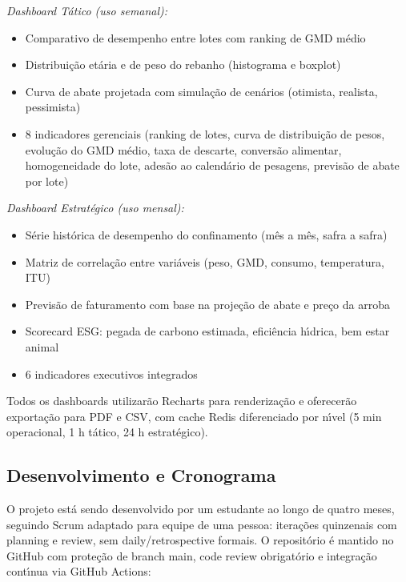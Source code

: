 \documentclass[12pt,a4paper]{article}
\begin{document}
\textit{Dashboard T\'atico (uso semanal):}

\begin{itemize}[leftmargin=*]
\item Comparativo de desempenho entre lotes com ranking de GMD m\'edio
\item Distribui\c c\~ao et\'aria e de peso do rebanho (histograma e boxplot)
\item Curva de abate projetada com simula\c c\~ao de cen\'arios (otimista, realista, pessimista)
\item 8 indicadores gerenciais (ranking de lotes, curva de distribui\c c\~ao de pesos, evolu\c c\~ao do GMD m\'edio, taxa de descarte, convers\~ao alimentar, homogeneidade do lote, ades\~ao ao calend\'ario de pesagens, previs\~ao de abate por lote)
\end{itemize}

\textit{Dashboard Estrat\'egico (uso mensal):}

\begin{itemize}[leftmargin=*]
\item S\'erie hist\'orica de desempenho do confinamento (m\^es a m\^es, safra a safra)
\item Matriz de correla\c c\~ao entre vari\'aveis (peso, GMD, consumo, temperatura, ITU)
\item Previs\~ao de faturamento com base na proje\c c\~ao de abate e pre\c co da arroba
\item Scorecard ESG: pegada de carbono estimada, efici\^encia h\'{\i}drica, bem estar animal
\item 6 indicadores executivos integrados
\end{itemize}

Todos os dashboards utilizar\~ao Recharts para renderiza\c c\~ao e oferecer\~ao exporta\c c\~ao para PDF e CSV, com cache Redis diferenciado por n\'{\i}vel (5 min operacional, 1 h t\'atico, 24 h estrat\'egico).

\subsection{Desenvolvimento e Cronograma}

O projeto est\'a sendo desenvolvido por um estudante ao longo de quatro meses, seguindo Scrum adaptado para equipe de uma pessoa: itera\c c\~oes quinzenais com planning e review, sem daily/retrospective formais. O reposit\'orio \'e mantido no GitHub com prote\c c\~ao de branch main, code review obrigat\'orio e integra\c c\~ao cont\'{\i}nua via GitHub Actions:
\end{document}
